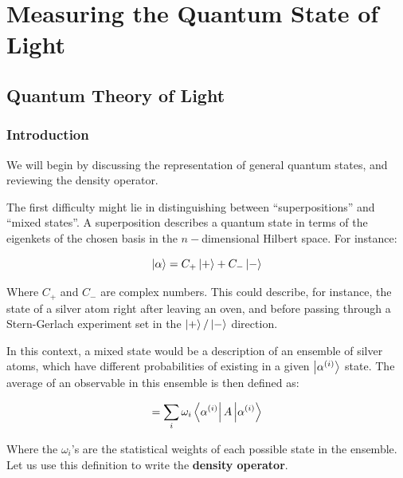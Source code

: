 \documentclass[12pt,a4paper]{report}
\begin{document}

\chapter{Measuring the Quantum State of Light}

\section{Quantum Theory of Light}

\subsection{Introduction}

We will begin by discussing the representation of general quantum states, and reviewing the density operator.

The first difficulty might lie in distinguishing between ``superpositions'' and ``mixed states''. A superposition describes a quantum state in terms of the eigenkets of the chosen basis in the $n-$dimensional Hilbert space. For instance:

\begin{equation}
    \ket{\alpha}=C_+\ket{+}+C_-\ket{-}
\end{equation}

Where $C_+$ and $C_-$ are complex numbers. This could describe, for instance, the state of a silver atom right after leaving an oven, and before passing through a Stern-Gerlach experiment set in the $\ket{+}/\ket{-}$ direction.

In this context, a mixed state would be a description of an ensemble of silver atoms, which have different probabilities of existing in a given $\ket{\alpha^{(i)}}$ state. The average of an observable in this ensemble is then defined as:

\begin{equation}
    [A]=\sum_{i}\omega_i\bra{\alpha^{(i)}}A\ket{\alpha^{(i)}}
\end{equation}

Where the $\omega_i$'s are the statistical weights of each possible state in the ensemble. Let us use this definition to write the \textbf{density operator}.
\end{document}
